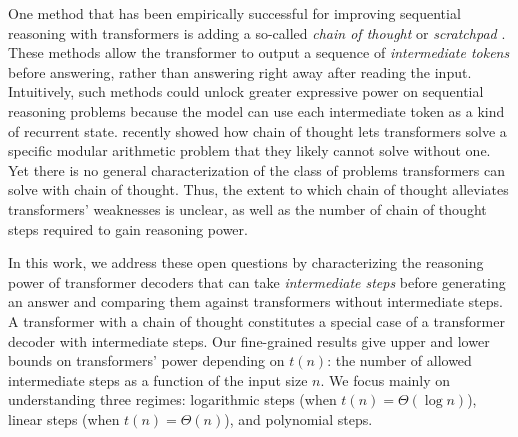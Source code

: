 \documentclass{article}
\begin{document}
One method that has been empirically
successful for improving sequential reasoning with transformers is adding a so-called \emph{chain of thought} \citep{wei2022chain} or \emph{scratchpad} \citep{nye2022show}. These methods allow the transformer to output a sequence of \emph{intermediate tokens} before answering, rather than answering right away after reading the input. Intuitively, such methods could unlock greater expressive power on sequential reasoning problems because the model can use each intermediate token as a kind of recurrent state. \citet{feng2023revealing} recently showed how chain of thought lets transformers solve a specific modular arithmetic problem that they likely cannot solve without one. Yet there is no general characterization of the class of problems transformers can solve with chain of thought. Thus, the extent to which chain of thought alleviates transformers' weaknesses is unclear, as well as the number of chain of thought steps required to gain reasoning power.


In this work, we address these open questions by characterizing the reasoning power of transformer decoders that can take \emph{intermediate steps} before generating an answer and comparing them against transformers without intermediate steps. A transformer with a chain of thought constitutes a special case of a transformer decoder with intermediate steps.
Our fine-grained results give upper and lower bounds on transformers' power depending on $t(n)$: the number of allowed intermediate steps as a function of the input size $n$. We focus mainly on understanding three regimes: logarithmic steps (when $t(n) = \Theta(\log n)$), linear steps (when $t(n) = \Theta(n)$), and polynomial steps.
\end{document}
